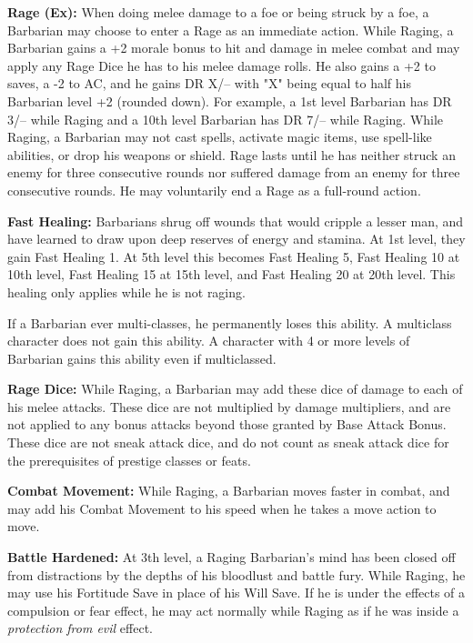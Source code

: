 \documentclass[10pt]{article}
\newcommand{\ability}[2]{\smallskip \noindent \textbf{#1} #2}
\newcommand{\spell}[1]{\emph{#1}}
\begin{document}
\ability{Rage (Ex):}{When doing melee damage to a foe or being struck by a foe, a Barbarian may choose to enter a Rage as an immediate action. While Raging, a Barbarian gains a +2 morale bonus to hit and damage in melee combat and may apply any Rage Dice he has to his melee damage rolls. He also gains a +2 to saves, a -2 to AC, and he gains DR X/-- with "X" being equal to half his Barbarian level +2 (rounded down). For example, a 1st level Barbarian has DR 3/-- while Raging and a 10th level Barbarian has DR 7/-- while Raging. While Raging, a Barbarian may not cast spells, activate magic items, use spell-like abilities, or drop his weapons or shield. Rage lasts until he has neither struck an enemy for three consecutive rounds nor suffered damage from an enemy for three consecutive rounds. He may voluntarily end a Rage as a full-round action.}

\ability{Fast Healing:}{Barbarians shrug off wounds that would cripple a lesser man, and have learned to draw upon deep reserves of energy and stamina. At 1st level, they gain Fast Healing 1. At 5th level this becomes Fast Healing 5, Fast Healing 10 at 10th level, Fast Healing 15 at 15th level, and Fast Healing 20 at 20th level. This healing only applies while he is not raging. \smallskip

If a Barbarian ever multi-classes, he permanently loses this ability. A multiclass character does not gain this ability.  A character with 4 or more levels of Barbarian gains this ability even if multiclassed.}

\ability{Rage Dice:}{While Raging, a Barbarian may add these dice of damage to each of his melee attacks. These dice are not multiplied by damage multipliers, and are not applied to any bonus attacks beyond those granted by Base Attack Bonus. These dice are not sneak attack dice, and do not count as sneak attack dice for the prerequisites of prestige classes or feats.}

\ability{Combat Movement:}{While Raging, a Barbarian moves faster in combat, and may add his Combat Movement to his speed when he takes a move action to move.}

\ability{Battle Hardened:}{At 3th level, a Raging Barbarian's mind has been closed off from distractions by the depths of his bloodlust and battle fury. While Raging, he may use his Fortitude Save in place of his Will Save. If he is under the effects of a compulsion or fear effect, he may act normally while Raging as if he was inside a \spell{protection from evil} effect.}
\end{document}
